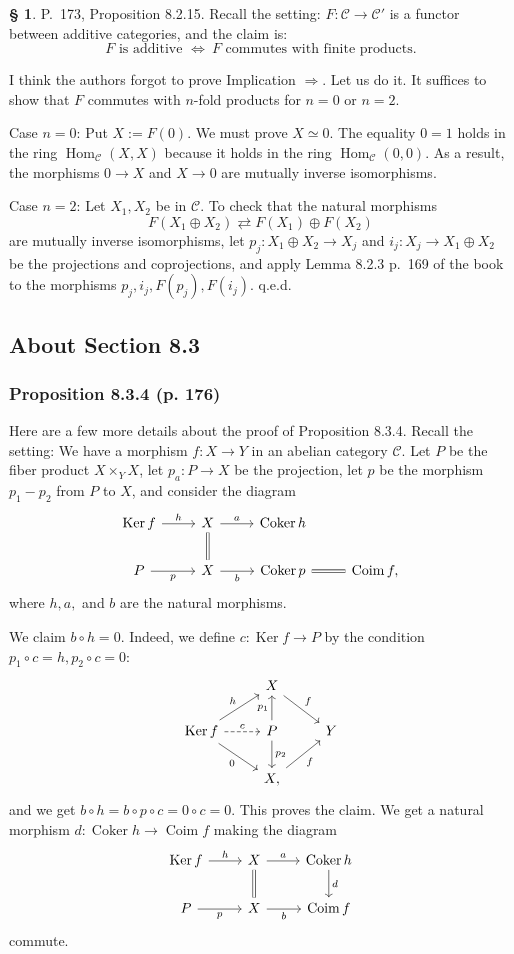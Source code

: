 \documentclass[12pt]{article}
\theoremstyle{remark}
\theoremstyle{definition}
\newtheorem{s}[thm]{\S}
\newcommand{\C}{\mathcal C}
\newcommand{\ssi}{\Leftrightarrow}
\newcommand{\then}{\Rightarrow}
\DeclareMathOperator{\Coim}{Coim}
\DeclareMathOperator{\Coker}{Coker}
\DeclareMathOperator{\Hom}{Hom}
\DeclareMathOperator{\Ker}{Ker}
\begin{document}
\begin{s} 
P.~173, Proposition 8.2.15. Recall the setting: $F:\C\to\C'$ is a functor between additive categories, and the claim is: 
$$
F\text{ is additive }\ssi\ F\text{ commutes with finite products}.
$$ 

I think the authors forgot to prove Implication $\then$. Let us do it. It suffices to show that $F$ commutes with $n$-fold products for $n=0$ or $n=2$. 

Case $n=0$: Put $X:=F(0)$. We must prove $X\simeq 0$. The equality $0=1$ holds in the ring $\Hom_\C(X,X)$ because it holds in the ring $\Hom_\C(0,0)$. As a result, the morphisms $0\to X$ and $X\to 0$ are mutually inverse isomorphisms. 

Case $n=2$: Let $X_1,X_2$ be in $\C$. To check that the natural morphisms 
%
\begin{equation}\label{173} 
F(X_1\oplus X_2)\rightleftarrows F(X_1)\oplus F(X_2)
\end{equation} 
%
are mutually inverse isomorphisms, let $p_j:X_1\oplus X_2\to X_j$ and $i_j:X_j\to X_1\oplus X_2$ be the projections and coprojections, and apply Lemma 8.2.3 p.~169 of the book to the morphisms $p_j,i_j,F(p_j),F(i_j)$. q.e.d.
\end{s}


\subsection{About Section 8.3}

\subsubsection{Proposition 8.3.4 (p. 176)}

Here are a few more details about the proof of Proposition 8.3.4. Recall the setting: We have a morphism $f:X\to Y$ in an abelian category $\C$. Let $P$ be the fiber product $X\times_YX$, let $p_a:P\to X$ be the projection, let $p$ be the morphism $p_1-p_2$ from $P$ to $X$, and consider the diagram 
$$
\begin{tikzcd}
\Ker f\ar{r}{h} &X\ar[equal]{d}\ar{r}{a}&\Coker h\\ 
P\ar{r}[swap]{p}&X\ar{r}[swap]{b}       &\Coker p\ar[equal]{r}&\Coim f,
\end{tikzcd}
$$ 
where $h,a,$ and $b$ are the natural morphisms. 

We claim $b\circ h=0$. Indeed, we define $c:\Ker f\to P$ by the condition $p_1\circ c=h,p_2\circ c=0$: 
$$
\begin{tikzcd}
{}&X\ar{dr}{f}\\ 
\Ker f\ar{ur}{h}\ar{dr}[swap]{0}\ar[dashed]{r}{c}&P\ar{u}{p_1}\ar{d}{p_2}&Y\\ 
{}&X\ar{ur}[swap]{f},
\end{tikzcd}
$$
and we get $b\circ h=b\circ p\circ c=0\circ c=0$. This proves the claim. We get a natural morphism $d:\Coker h\to\Coim f$ making the diagram 
$$
\begin{tikzcd}
\Ker f\ar{r}{h}&X\ar[equal]{d}\ar{r}{a}&\Coker h\ar{d}{d}\\ 
P\ar{r}[swap]{p}&X\ar{r}[swap]{b}&\Coim f
\end{tikzcd}
$$ 
commute. 
\end{document}
